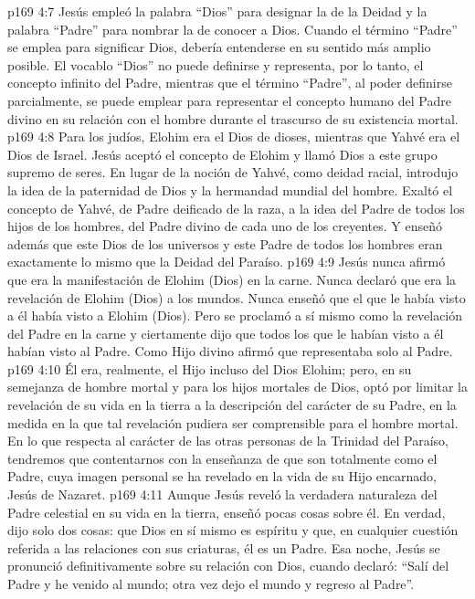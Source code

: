 \vs p169 4:7 Jesús empleó la palabra “Dios” para designar la  de la Deidad y la palabra “Padre” para nombrar la  de conocer a Dios. Cuando el término “Padre” se emplea para significar Dios, debería entenderse en su sentido más amplio posible. El vocablo “Dios” no puede definirse y representa, por lo tanto, el concepto infinito del Padre, mientras que el término “Padre”, al poder definirse parcialmente, se puede emplear para representar el concepto humano del Padre divino en su relación con el hombre durante el trascurso de su existencia mortal.
\vs p169 4:8 Para los judíos, Elohim era el Dios de dioses, mientras que Yahvé era el Dios de Israel. Jesús aceptó el concepto de Elohim y llamó Dios a este grupo supremo de seres. En lugar de la noción de Yahvé, como deidad racial, introdujo la idea de la paternidad de Dios y la hermandad mundial del hombre. Exaltó el concepto de Yahvé, de Padre deificado de la raza, a la idea del Padre de todos los hijos de los hombres, del Padre divino de cada uno de los creyentes. Y enseñó además que este Dios de los universos y este Padre de todos los hombres eran exactamente lo mismo que la Deidad del Paraíso.
\vs p169 4:9 Jesús nunca afirmó que era la manifestación de Elohim (Dios) en la carne. Nunca declaró que era la revelación de Elohim (Dios) a los mundos. Nunca enseñó que el que le había visto a él había visto a Elohim (Dios). Pero se proclamó a sí mismo como la revelación del Padre en la carne y ciertamente dijo que todos los que le habían visto a él habían visto al Padre. Como Hijo divino afirmó que representaba solo al Padre.
\vs p169 4:10 Él era, realmente, el Hijo incluso del Dios Elohim; pero, en su semejanza de hombre mortal y para los hijos mortales de Dios, optó por limitar la revelación de su vida en la tierra a la descripción del carácter de su Padre, en la medida en la que tal revelación pudiera ser comprensible para el hombre mortal. En lo que respecta al carácter de las otras personas de la Trinidad del Paraíso, tendremos que contentarnos con la enseñanza de que son totalmente como el Padre, cuya imagen personal se ha revelado en la vida de su Hijo encarnado, Jesús de Nazaret.
\vs p169 4:11 \pc Aunque Jesús reveló la verdadera naturaleza del Padre celestial en su vida en la tierra, enseñó pocas cosas sobre él. En verdad, dijo solo dos cosas: que Dios en sí mismo es espíritu y que, en cualquier cuestión referida a las relaciones con sus criaturas, él es un Padre. Esa noche, Jesús se pronunció definitivamente sobre su relación con Dios, cuando declaró: “Salí del Padre y he venido al mundo; otra vez dejo el mundo y regreso al Padre”.
